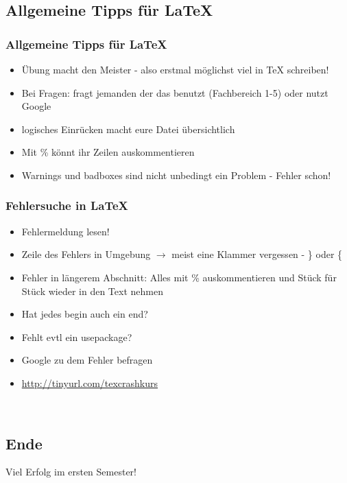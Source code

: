 \documentclass{beamer}
\begin{document}
\subsection{Allgemeine Tipps für LaTeX}
\begin{frame}
\frametitle{Allgemeine Tipps für \LaTeX}
  \begin{itemize}
    \item<1-> Übung macht den Meister - also erstmal möglichst viel in TeX schreiben!
    \item<2-> Bei Fragen: fragt jemanden der das benutzt (Fachbereich 1-5) oder nutzt Google
    \item<3-> logisches Einrücken macht eure Datei übersichtlich
    \item<4-> Mit \% könnt ihr Zeilen auskommentieren
    \item<5-> Warnings und badboxes sind nicht unbedingt ein Problem - Fehler schon!
  \end{itemize}
\end{frame}

\begin{frame}
\frametitle{Fehlersuche in \LaTeX}
  \begin{itemize}
    \item<1-> Fehlermeldung lesen!
    \item<2-> Zeile des Fehlers in Umgebung $\rightarrow$ meist eine Klammer vergessen - \} oder \{
    \item<3-> Fehler in längerem Abschnitt: Alles mit \% auskommentieren und Stück für Stück wieder in den Text nehmen
    \item<4-> Hat jedes \alert<4>{begin} auch ein \alert<4>{end}?
    \item<5-> Fehlt evtl ein \alert<5>{usepackage}?
    \item<6-> Google zu dem Fehler befragen
    \item<7-> \url{http://tinyurl.com/texcrashkurs}
  \end{itemize}
\end{frame}



\begin{frame}
 \begin{center}
  \Large {} \\
 \end{center}
\end{frame}


\subsection{Ende}
\begin{frame}
\Huge Viel Erfolg im ersten Semester!
\end{frame}
\end{document}
